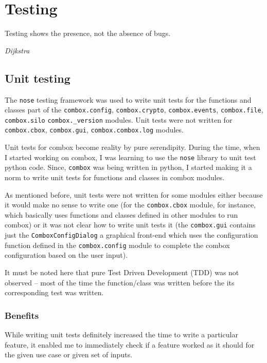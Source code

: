 \chapter{Testing}

\epigraph{Testing shows the presence, not the absence of
  bugs.}{\textit{Dijkstra}\cite{dijkstra69}}

\section{Unit testing}

The \verb+nose+\cite{pylib:nose} testing framework was used to
write unit tests for the functions and classes part of the
\verb+combox.config+, \verb+combox.crypto+, \verb+combox.events+,
\verb+combox.file+, \verb+combox.silo+ \verb+combox._version+
modules. Unit tests were not written for \verb+combox.cbox+,
\verb+combox.gui+, \verb+combox.combox.log+ modules.

Unit tests for combox become reality by pure serendipity. During the
time, when I started working on combox, I was learning to use the
\verb+nose+ library to unit test python code. Since, \verb+combox+ was
being written in python, I started making it a norm to write unit
tests for functions and classes in combox modules.

As mentioned before, unit tests were not written for some modules
either because it would make no sense to write one (for the
\verb+combox.cbox+ module, for instance, which basically uses
functions and classes defined in other modules to run combox) or it
was not clear how to write unit tests it (the \verb+combox.gui+
contains just the \verb+ComboxConfigDialog+ a graphical front-end
which uses the configuration function defined in the
\verb+combox.config+ module to complete the combox configuration based
on the user input).

It must be noted here that pure Test Driven Development (TDD) was not
observed -- most of the time the function/class was written before the
its corresponding test was written.

\subsection{Benefits}

While writing unit tests definitely increased the time to write a
particular feature, it enabled me to immediately check if a feature
worked as it should for the given use case or given set of inputs.

